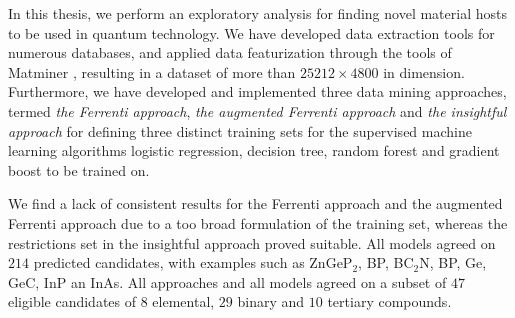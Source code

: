 In this thesis, we perform an exploratory analysis for finding novel material hosts to be used in quantum technology. We have developed data extraction tools for numerous databases, and applied data featurization through the tools of Matminer \cite{Ward2018}, resulting in a dataset of more than $25212\times4800$ in dimension. Furthermore, we have developed and implemented three data mining approaches, termed \textit{the Ferrenti approach}, \textit{the augmented Ferrenti approach} and \textit{the insightful approach} for defining three distinct training sets for the supervised machine learning algorithms logistic regression, decision tree, random forest and gradient boost to be trained on.

We find a lack of consistent results for the Ferrenti approach and the augmented Ferrenti approach due to a too broad formulation of the training set, whereas the restrictions set in the insightful approach proved suitable. All models agreed on $214$ predicted candidates, with examples such as ZnGeP$_2$, BP, BC$_2$N, BP, Ge, GeC, InP an InAs. All approaches and all models agreed on a subset of $47$ eligible candidates of $8$ elemental, $29$ binary and $10$ tertiary compounds.

